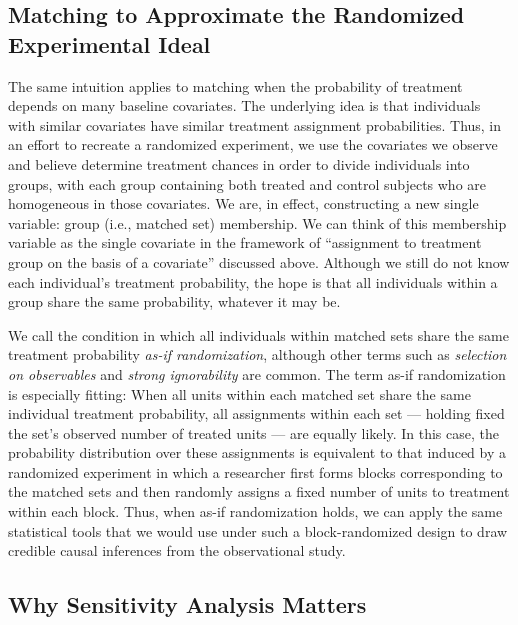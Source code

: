 \documentclass[
  12pt,
  leqno]{article}
\begin{document}
\subsection{Matching to Approximate the Randomized Experimental
Ideal}\label{matching-to-approximate-the-randomized-experimental-ideal}

The same intuition applies to matching when the probability of treatment
depends on many baseline covariates. The underlying idea is that
individuals with similar covariates have similar treatment assignment
probabilities. Thus, in an effort to recreate a randomized experiment,
we use the covariates we observe and believe determine treatment chances
in order to divide individuals into groups, with each group containing
both treated and control subjects who are homogeneous in those
covariates. We are, in effect, constructing a new single variable: group
(i.e., matched set) membership. We can think of this membership variable
as the single covariate in the framework of ``assignment to treatment
group on the basis of a covariate'' \citep{rubin1977} discussed above.
Although we still do not know each individual's treatment probability,
the hope is that all individuals within a group share the same
probability, whatever it may be.

We call the condition in which all individuals within matched sets share
the same treatment probability \emph{as-if randomization}, although
other terms such as \emph{selection on observables} and \emph{strong
ignorability} are common. The term as-if randomization is especially
fitting: When all units within each matched set share the same
individual treatment probability, all assignments within each set ---
holding fixed the set's observed number of treated units --- are equally
likely. In this case, the probability distribution over these
assignments is equivalent to that induced by a randomized experiment in
which a researcher first forms blocks corresponding to the matched sets
and then randomly assigns a fixed number of units to treatment within
each block. Thus, when as-if randomization holds, we can apply the same
statistical tools that we would use under such a block-randomized design
to draw credible causal inferences from the observational study.

\subsection{Why Sensitivity Analysis
Matters}\label{why-sensitivity-analysis-matters}
\end{document}
